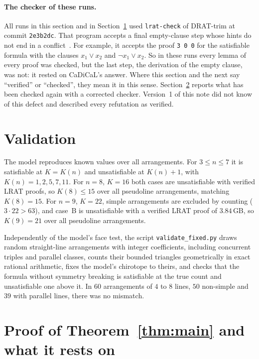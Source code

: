 \documentclass[11pt]{article}
\theoremstyle{definition}
\theoremstyle{remark}
\begin{document}
\paragraph{The checker of these runs.} All runs in this section and in
Section~\ref{sec:validation} used \texttt{lrat-check} of DRAT-trim at commit \texttt{2e3b2dc}.
That program accepts a final empty-clause step whose hints do not end in a
conflict~\cite{drattrim42}. For example, it accepts the proof \texttt{3 0 0} for the satisfiable
formula with the clauses $x_1 \vee x_2$ and $\neg x_1 \vee x_2$. So in these runs every lemma of
every proof was checked, but the last step, the derivation of the empty clause, was not: it rested
on CaDiCaL's answer. Where this section and the next say ``verified'' or ``checked'', they mean
it in this sense. Section~\ref{sec:trust} reports what has been checked again with a corrected
checker. Version~1 of this note did not know of this defect and described every refutation as
verified.

\section{Validation}\label{sec:validation}

The model reproduces known values over all arrangements. For $3 \le n \le 7$ it is satisfiable at
$K = K(n)$ and unsatisfiable at $K(n) + 1$, with $K(n) = 1, 2, 5, 7, 11$. For $n = 8$, $K = 16$
both cases are unsatisfiable with verified LRAT proofs, so $K(8) \le 15$ over all pseudoline
arrangements, matching $K(8) = 15$. For $n = 9$, $K = 22$, simple arrangements are excluded by
counting ($3 \cdot 22 > 63$), and case~B is unsatisfiable with a verified LRAT proof of $3.84$\,GB,
so $K(9) = 21$ over all pseudoline arrangements.

Independently of the model's face test, the script \texttt{validate\_fixed.py} draws random
straight-line arrangements with integer coefficients, including concurrent triples and parallel
classes, counts their bounded triangles geometrically in exact rational arithmetic, fixes the
model's chirotope to theirs, and checks that the formula without symmetry breaking is satisfiable
at the true count and unsatisfiable one above it. In $60$ arrangements of $4$ to $8$ lines, $50$
non-simple and $39$ with parallel lines, there was no mismatch.

\section{Proof of Theorem~\ref{thm:main} and what it rests on}\label{sec:trust}
\end{document}
